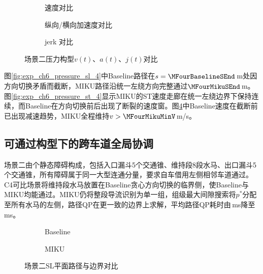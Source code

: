 \begin{figure}[H]
\centering
\begin{subfigure}[b]{\textwidth}
  \centering
  
  \caption{速度对比}
  \label{fig:exp_ch6_pressure_va_4:a}
\end{subfigure}

\begin{subfigure}[b]{\textwidth}
  \centering
  
  \caption{纵向/横向加速度对比}
  \label{fig:exp_ch6_pressure_va_4:b}
\end{subfigure}

\begin{subfigure}[b]{\textwidth}
  \centering
  
  \caption{jerk 对比}
  \label{fig:exp_ch6_pressure_va_4:c}
\end{subfigure}
\caption{场景二压力构型$v(t)$、$a(t)$、$j(t)$对比}
\label{fig:exp_ch6_pressure_va_4}
\end{figure}

图\ref{fig:exp_ch6_pressure_sl_4}中Baseline路径在$s=\MFourBaselineSEnd$\,m处因方向切换矛盾而截断，MIKU路径沿统一左绕方向完整通过$\MFourMikuSEnd$\,m。图\ref{fig:exp_ch6_pressure_st_4}显示MIKU的ST速度走廊在统一左绕边界下保持连续，而Baseline在方向切换前后出现了断裂的速度窗。图\ref{fig:exp_ch6_pressure_va_4}中Baseline速度在截断前已出现减速趋势，MIKU全程维持$v>\MFourMikuMinV$\,m/s。

\subsection{可通过构型下的跨车道全局协调}

场景二由\DenseConstructionTotalObstacles{}个静态障碍构成，包括入口漏斗5个交通锥、维持段8段水马、出口漏斗5个交通锥，所有障碍属于同一大型连通分量，要求自车借用左侧相邻车道通过。C4可比场景将维持段水马放置在Baseline贪心方向切换的临界侧，使Baseline与MIKU均能通过。MIKU仍将整段导流识别为单一组，组级最大间隙搜索将$p^{*}$分配至所有水马的左侧，路径QP在更一致的边界上求解，平均路径QP耗时由\MEightBaselineQpPath\,ms降至\MEightMikuQpPath\,ms。

\begin{figure}[H]
\centering
\begin{subfigure}[b]{\textwidth}
  \centering
  
  \caption{Baseline}
  \label{fig:exp_ch6_sl_4:a}
\end{subfigure}

\begin{subfigure}[b]{\textwidth}
  \centering
  
  \caption{MIKU}
  \label{fig:exp_ch6_sl_4:b}
\end{subfigure}
\caption{场景二SL平面路径与边界对比}
\label{fig:exp_ch6_sl_4}
\end{figure}

